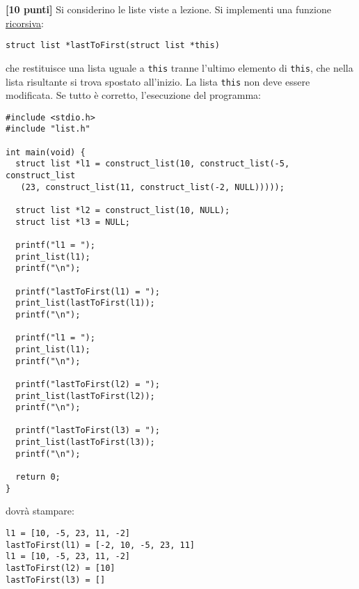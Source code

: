 \documentclass{article}[10pt]
\newcounter{esnu}
\newenvironment{esercizio}{\medskip \noindent {\bf Esercizio\addtocounter{esnu}{1} \arabic{esnu}}}{}
\begin{document}
\begin{esercizio}
\textbf{[10 punti]}
Si considerino le liste viste a lezione. Si implementi una funzione \underline{ricorsiva}:
\begin{verbatim}
struct list *lastToFirst(struct list *this)
\end{verbatim}
che restituisce una lista uguale a \texttt{this} tranne l'ultimo elemento di \texttt{this},
che nella lista risultante si trova spostato all'inizio. La lista \texttt{this} non deve
essere modificata.
Se tutto \`e corretto, l'esecuzione del programma:

{\small
\begin{verbatim}
#include <stdio.h>
#include "list.h"

int main(void) {
  struct list *l1 = construct_list(10, construct_list(-5, construct_list
   (23, construct_list(11, construct_list(-2, NULL)))));

  struct list *l2 = construct_list(10, NULL);
  struct list *l3 = NULL;

  printf("l1 = ");
  print_list(l1);
  printf("\n");

  printf("lastToFirst(l1) = ");
  print_list(lastToFirst(l1));
  printf("\n");

  printf("l1 = ");
  print_list(l1);
  printf("\n");

  printf("lastToFirst(l2) = ");
  print_list(lastToFirst(l2));
  printf("\n");

  printf("lastToFirst(l3) = ");
  print_list(lastToFirst(l3));
  printf("\n");

  return 0;
}
\end{verbatim}
}
\noindent
dovr\`a stampare:

{\small
\begin{verbatim}
l1 = [10, -5, 23, 11, -2]
lastToFirst(l1) = [-2, 10, -5, 23, 11]
l1 = [10, -5, 23, 11, -2]
lastToFirst(l2) = [10]
lastToFirst(l3) = []
\end{verbatim}
}
%
\end{esercizio}
\end{document}
